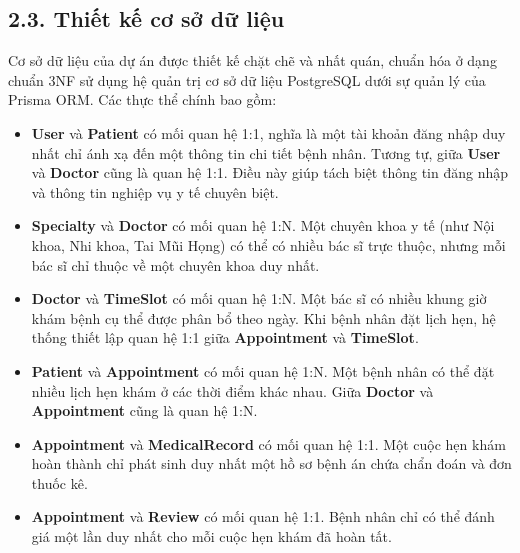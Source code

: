 \documentclass[12pt,a4paper]{report}
\begin{document}
\subsection*{2.3. Thiết kế cơ sở dữ liệu}
\hspace{1em} Cơ sở dữ liệu của dự án được thiết kế chặt chẽ và nhất quán, chuẩn hóa ở dạng chuẩn 3NF sử dụng hệ quản trị cơ sở dữ liệu PostgreSQL dưới sự quản lý của Prisma ORM. Các thực thể chính bao gồm:
\begin{itemize}
    \item \textbf{User} và \textbf{Patient} có mối quan hệ 1:1, nghĩa là một tài khoản đăng nhập duy nhất chỉ ánh xạ đến một thông tin chi tiết bệnh nhân. Tương tự, giữa \textbf{User} và \textbf{Doctor} cũng là quan hệ 1:1. Điều này giúp tách biệt thông tin đăng nhập và thông tin nghiệp vụ y tế chuyên biệt.
    
    \item \textbf{Specialty} và \textbf{Doctor} có mối quan hệ 1:N. Một chuyên khoa y tế (như Nội khoa, Nhi khoa, Tai Mũi Họng) có thể có nhiều bác sĩ trực thuộc, nhưng mỗi bác sĩ chỉ thuộc về một chuyên khoa duy nhất.
    
    \item \textbf{Doctor} và \textbf{TimeSlot} có mối quan hệ 1:N. Một bác sĩ có nhiều khung giờ khám bệnh cụ thể được phân bổ theo ngày. Khi bệnh nhân đặt lịch hẹn, hệ thống thiết lập quan hệ 1:1 giữa \textbf{Appointment} và \textbf{TimeSlot}.
    
    \item \textbf{Patient} và \textbf{Appointment} có mối quan hệ 1:N. Một bệnh nhân có thể đặt nhiều lịch hẹn khám ở các thời điểm khác nhau. Giữa \textbf{Doctor} và \textbf{Appointment} cũng là quan hệ 1:N.
    
    \item \textbf{Appointment} và \textbf{MedicalRecord} có mối quan hệ 1:1. Một cuộc hẹn khám hoàn thành chỉ phát sinh duy nhất một hồ sơ bệnh án chứa chẩn đoán và đơn thuốc kê.
    
    \item \textbf{Appointment} và \textbf{Review} có mối quan hệ 1:1. Bệnh nhân chỉ có thể đánh giá một lần duy nhất cho mỗi cuộc hẹn khám đã hoàn tất.
\end{itemize}

\newpage
\end{document}
